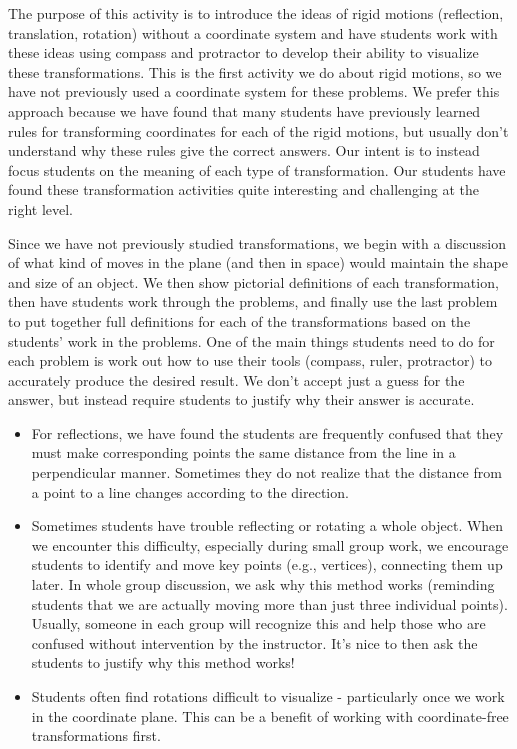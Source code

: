 \documentclass{ximera}
\begin{document}
\newpage
\begin{instructorNotes}
The purpose of this activity is to introduce the ideas of rigid motions (reflection, translation, rotation) without a coordinate system and have students work with these ideas using compass and protractor to develop their ability to visualize these transformations.  This is the first activity we do about rigid motions, so we have not previously used a coordinate system for these problems.  We prefer this approach because we have found that many students have previously learned rules for transforming coordinates for each of the rigid motions, but usually don't understand why these rules give the correct answers.  Our intent is to instead focus students on the meaning of each type of transformation.  Our students have found these transformation activities quite interesting and challenging at the right level.

Since we have not previously studied transformations, we begin with a discussion of what kind of moves in the plane (and then in space) would maintain the shape and size of an object. We then show pictorial definitions of each transformation, then have students work through the problems, and finally use the last problem to put together full definitions for each of the transformations based on the students' work in the problems.  One of the main things students need to do for each problem is work out how to use their tools (compass, ruler, protractor) to accurately produce the desired result.  We don't accept just a guess for the answer, but instead require students to justify why their answer is accurate.  
\begin{itemize}
    \item For reflections, we have found the students are frequently confused that they must make corresponding points the same distance from the line in a perpendicular manner.  Sometimes they do not realize that the distance from a point to a line changes according to the direction.  
    \item Sometimes students have trouble reflecting or rotating a whole object.  When we encounter this difficulty, especially during small group work, we encourage students to identify and move key points (e.g., vertices), connecting them up later.  In whole group discussion, we ask why this method works (reminding students that we are actually moving more than just three individual points).  Usually, someone in each group will recognize this and help those who are confused without intervention by the instructor.  It's nice to then ask the students to justify why this method works!
    \item Students often find rotations difficult to visualize - particularly once we work in the coordinate plane.  This can be a benefit of working with coordinate-free transformations first.
\end{itemize}





\end{instructorNotes}
\end{document}
